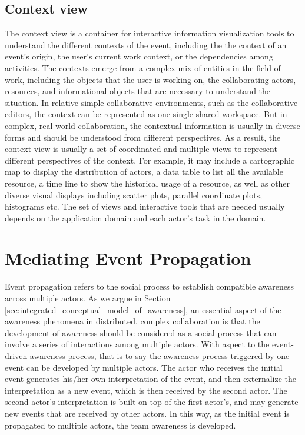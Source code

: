 \subsection{Context view} %
\label{sub:context_view}
The context view is a container for interactive information visualization tools to understand the different contexts of the event, including the the context of an event's origin, the user's current work context, or the dependencies among activities. The contexts emerge from a complex mix of entities in the field of work, including the objects that the user is working on, the collaborating actors, resources, and informational objects that are necessary to understand the situation. In relative simple collaborative environments, such as the collaborative editors, the context can be represented as one single shared workspace. But in complex, real-world collaboration, the contextual information is usually in diverse forms and should be understood from different perspectives. As a result, the context view is usually a set of coordinated and multiple views to represent different perspectives of the context. For example, it may include a cartographic map to display the distribution of actors, a data table to list all the available resource, a time line to show the historical usage of a resource, as well as other diverse visual displays including scatter plots, parallel coordinate plots, histograms etc. The set of views and interactive tools that are needed usually depends on the application domain and each actor's task in the domain.

\section{Mediating Event Propagation} %
\label{sec:mediating_event_propagation}
Event propagation refers to the social process to establish compatible awareness across multiple actors. As we argue in Section \ref{sec:integrated_conceptual_model_of_awareness}, an essential aspect of the awareness phenomena in distributed, complex collaboration is that the development of awareness should be considered as a social process that can involve a series of interactions among multiple actors. With aspect to the event-driven awareness process, that is to say the awareness process triggered by one event can be developed by multiple actors. The actor who receives the initial event generates his/her own interpretation of the event, and then externalize the interpretation as a new event, which is then received by the second actor. The second actor's interpretation is built on top of the first actor's, and may generate new events that are received by other actors. In this way, as the initial event is propagated to multiple actors, the team awareness is developed.

